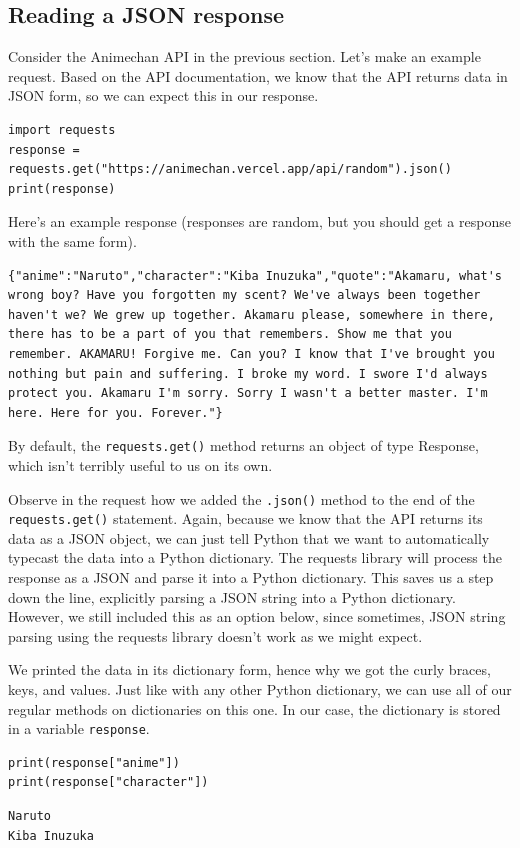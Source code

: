 \subsection{Reading a JSON response}
Consider the Animechan API in the previous section. Let's make an example request. Based on the API documentation, we know that the API returns data in JSON form, so we can expect this in our response.
\begin{lstlisting}[style=pippython]
import requests
response = requests.get("https://animechan.vercel.app/api/random").json()
print(response)
\end{lstlisting}
Here's an example response (responses are random, but you should get a response with the same form).
\begin{lstlisting}[style=none]
{"anime":"Naruto","character":"Kiba Inuzuka","quote":"Akamaru, what's wrong boy? Have you forgotten my scent? We've always been together haven't we? We grew up together. Akamaru please, somewhere in there, there has to be a part of you that remembers. Show me that you remember. AKAMARU! Forgive me. Can you? I know that I've brought you nothing but pain and suffering. I broke my word. I swore I'd always protect you. Akamaru I'm sorry. Sorry I wasn't a better master. I'm here. Here for you. Forever."}
\end{lstlisting}
By default, the \verb|requests.get()| method returns an object of type Response, which isn't terribly useful to us on its own.\par
Observe in the request how we added the \verb|.json()| method to the end of the \verb|requests.get()| statement. Again, because we know that the API returns its data as a JSON object, we can just tell Python that we want to automatically typecast the data into a Python dictionary. The requests library will process the response as a JSON and parse it into a Python dictionary. This saves us a step down the line, explicitly parsing a JSON string into a Python dictionary. However, we still included this as an option below, since sometimes, JSON string parsing using the requests library doesn't work as we might expect.\par
We printed the data in its dictionary form, hence why we got the curly braces, keys, and values. Just like with any other Python dictionary, we can use all of our regular methods on dictionaries on this one. In our case, the dictionary is stored in a variable \verb|response|.
\begin{lstlisting}[style=pippython]
print(response["anime"])
print(response["character"])
\end{lstlisting}
\begin{lstlisting}[style=none]
Naruto
Kiba Inuzuka
\end{lstlisting}

